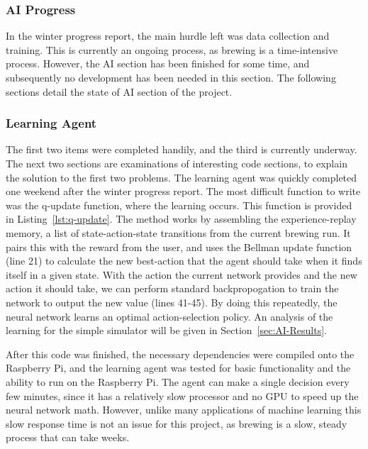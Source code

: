 \documentclass[draftclsnofoot,onecolumn,letterpaper,10pt]{IEEEtran}
\begin{document}
\subsubsection{AI Progress}
In the winter progress report, the main hurdle left was data collection and training. This is currently an ongoing process, as brewing is a time-intensive process. However, the AI section has been finished for some time, and subsequently no development has been needed in this section. The following sections detail the state of AI section of the project.

\subsubsection{Learning Agent}
The first two items were completed handily, and the third is currently underway. The next two sections are examinations of interesting code sections, to explain the solution to the first two problems.
The learning agent was quickly completed one weekend after the winter progress report. The most difficult function to write was the q-update function, where the learning occurs. This function is provided in Listing~\ref{lst:q-update}.
\label{lst:q-update}
The method works by assembling the experience-replay memory, a list of state-action-state transitions from the current brewing run. It pairs this with the reward from the user, and uses the Bellman update function (line 21) to calculate the new best-action that the agent should take when it finds itself in a given state. With the action the current network provides and the new action it should take, we can perform standard backpropogation to train the network to output the new value (lines 41-45). By doing this repeatedly, the neural network learns an optimal action-selection policy. An analysis of the learning for the simple simulator will be given in Section~\ref{sec:AI-Results}.

After this code was finished, the necessary dependencies were compiled onto the Raspberry Pi, and the learning agent was tested for basic functionality and the ability to run on the Raspberry Pi. The agent can make a single decision every few minutes, since it has a relatively slow processor and no GPU to speed up the neural network math. However, unlike many applications of machine learning this slow response time is not an issue for this project, as brewing is a slow, steady process that can take weeks.
\end{document}
